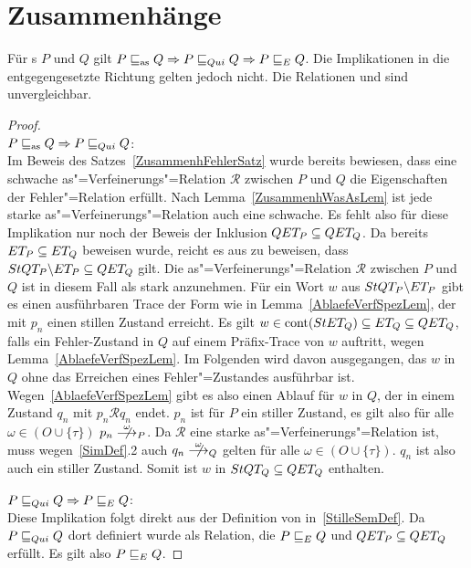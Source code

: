 \section{Zusammenhänge}

\begin{Satz}
  \label{ZusammenhStilleSatz}
  Für \MEIO{}s $P$ und $Q$ gilt $P \sqsubseteq _{\mathrm{as}} Q \Rightarrow P  \sqsubseteq  _{Qui} Q \Rightarrow
  P  \sqsubseteq  _E Q$. Die Implikationen in die entgegengesetzte Richtung gelten jedoch
  nicht. Die Relationen \wasRel{} und \QRel{} sind unvergleichbar.
\end{Satz}
\begin{proof}\mbox{}\\
  $P \sqsubseteq _{\mathrm{as}} Q \Rightarrow P  \sqsubseteq  _{Qui} Q$:\\
  Im Beweis des Satzes~\ref{ZusammenhFehlerSatz} wurde bereits bewiesen, dass
  eine schwache as"=Verfeinerungs"=Relation $\mathcal{R}$ zwischen $P$ und $Q$
  die Eigenschaften der Fehler"=Relation \ERel{} erfüllt. Nach
  Lemma~\ref{ZusammenhWasAsLem} ist jede starke as"=Verfeinerungs"=Relation
  auch eine schwache. Es fehlt also für diese Implikation nur noch der Beweis
  der Inklusion $QET _P \subseteq QET _Q$. Da bereits $ET _P\subseteq ET
  _Q$ beweisen wurde, reicht es aus zu beweisen, dass $StQT _P \backslash ET
  _P\subseteq QET _Q$ gilt. Die as"=Verfeinerungs"=Relation $\mathcal{R}$
  zwischen $P$ und $Q$ ist in diesem Fall als stark anzunehmen. Für ein Wort
  $w$ aus $StQT _P \backslash ET _P$ gibt es einen ausführbaren Trace der
  Form wie in Lemma~\ref{AblaefeVerfSpezLem}, der mit $p_n$ einen stillen
  Zustand erreicht. Es gilt $w\in\mathrm{cont} (StET _Q) \subseteq ET _Q\subseteq QET
  _Q$, falls ein Fehler-Zustand in $Q$ auf einem Präfix-Trace von $w$ auftritt,
  wegen Lemma~\ref{AblaefeVerfSpezLem}. Im Folgenden wird davon ausgegangen,
  das $w$ in $Q$ ohne das Erreichen eines Fehler"=Zustandes ausführbar ist.
  Wegen~\ref{AblaefeVerfSpezLem} gibt es also einen Ablauf für $w$ in $Q$, der
  in einem Zustand $q_n$ mit $p_n \mathcal{R} q_n$ endet. $p_n$ ist für $P$ ein
  stiller Zustand, es gilt also für alle $\omega \in (O\cup \{\tau\})$ $p_n
  \nmust[\omega]_P$. Da $\mathcal{R}$ eine starke as"=Verfeinerungs"=Relation
  ist, muss wegen~\ref{SimDef}.2 auch $q_n \nmust[\omega]_Q$ gelten für alle
  $\omega \in (O\cup \{\tau\})$. $q_n$ ist also auch ein stiller Zustand. Somit
  ist $w$ in $StQT _Q\subseteq QET _Q$ enthalten.

  $P  \sqsubseteq  _{Qui} Q \Rightarrow P  \sqsubseteq  _E Q$:\\
  Diese Implikation folgt direkt aus der Definition von \QRel{}
  in~\ref{StilleSemDef}. Da $P  \sqsubseteq  _{Qui} Q$ dort definiert wurde als Relation, die
  $P  \sqsubseteq  _E Q$ und $QET _P \subseteq QET _Q$ erfüllt. Es gilt also $P  \sqsubseteq  _E Q$.


\end{proof}
